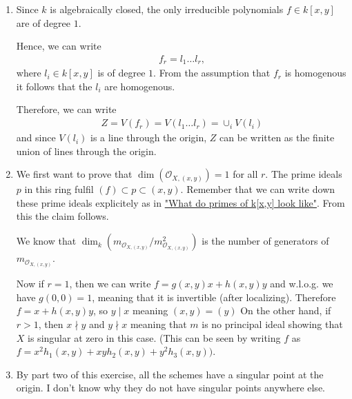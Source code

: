 \begin{exercise}{3}
    \begin{enumerate}
        \item{Since $k$ is algebraically closed, the only irreducible
            polynomials $f\in k[x,y]$ are of degree $1$.
        
            Hence, we can write 
            \begin{align*}
                f_r=l_1  \dots  l_r,
            \end{align*}
            where $l_i\in k[x,y]$ is of degree $1$. From the assumption that $f_r$ is homogenous it follows that the $l_i$ are homogenous.

            Therefore, we can write
            \begin{align*}
                Z=V(f_r)=V(l_1 \dots  l_r)=\cup_i V(l_i)
            \end{align*}
            and since $V(l_i)$ is a line through the origin, $Z$ can be written as the finite union of lines through the origin.
            }
        \item{We first want to prove that $\dim(\mathcal{O}_{X,(x,y)})=1$ for
            all $r$. The prime ideals $p$ in this ring fulfil $(f)\subset p
            \subset (x,y)$. Remember that we can write down these prime ideals
            explicitely as in
            \href{https://math.stackexchange.com/questions/56916/what-do-prime-ideals-in-kx-y-look-like}{"What
            do primes of k[x,y] look like"}. From this the claim follows.

            We know that
            $\dim_k(m_{\mathcal{O}_{X,(x,y)}}/m_{\mathcal{O}_{X,(x,y)}}^2)$ is
            the number of generators of $m_{\mathcal{O}_{X,(x,y)}}$.

            Now if $r=1$, then we can write $f=g(x,y)x+h(x,y)y$ and w.l.o.g. we
            have $g(0,0)=1$, meaning that it is invertible (after localizing).
            Therefore $f=x+h(x,y)y$, so $y\mid x$ meaning $(x,y)=(y)$
            On the other hand, if $r>1$, then $x\nmid y$ and $y\nmid x$ meaning
            that $m$ is no principal ideal showing that $X$ is singular at zero
            in this case. (This can be seen by writing $f$ as
            $f=x^2h_1(x,y)+xyh_2(x,y)+y^2h_3(x,y))$.
            }
        \item{By part two of this exercise, all the schemes have a singular
            point at the origin. I don't know why they do not have singular
            points anywhere else.}
    \end{enumerate}

\end{exercise}

